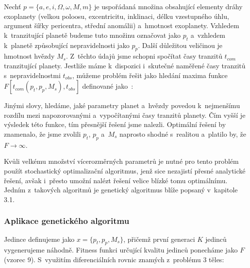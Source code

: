 \documentclass[a4paper,12pt]{article}
\begin{document}
{{{Nechť $p = \{a, e, i, \Omega, \omega, M, m\}$ je uspořádaná množina obsahující elementy dráhy exoplanety (velkou poloosu, excentricitu, inklinaci, délku vzestupného úhlu, argument šířky pericentra, střední anomálii) a~hmotnost exoplanety. Vzhledem k~tranzitující planetě budeme tuto množinu označovat jako $p_t$ a~vzhledem k~planetě způsobující nepravidelnosti jako $p_p$. Další důležitou veličinou je hmotnost hvězdy $M_s$. Z~těchto údajů jsme schopni spočítat časy tranzitů $t_{com}$ tranzitující planety. Jestliže máme k~dispozici i~skutečné naměřené časy tranzitů s~nepravidelnostmi $t_{obs}$, můžeme problém řešit jako hledání maxima funkce $F[t_{com}(p_t, p_p, M_s), t_{obs}]$ definované jako~\cite{ttv}:


Jinými slovy, hledáme, jaké parametry planet a~hvězdy povedou k~nejmenšímu rozdílu mezi napozorovanými a~vypočítanými časy tranzitů planety. Čím vyšší je výsledek této funkce, tím přesnější řešení jsme nalezli. Optimální řešení by znamenalo, že jsme zvolili $p_t$, $p_p$ a~$M_s$ naprosto shodné s~realitou a~platilo by, že $F\to\infty$.

Kvůli velkému množství vícerozměrných parametrů je nutné pro tento problém použít stochastický optimalizační algoritmus, jenž sice nezajistí přesné analytické řešení, avšak i~přesto umožní nalézt řešení velice blízké tomu optimálnímu. Jedním z~takových algoritmů je genetický algoritmus blíže popsaný v~kapitole 3.1.~\cite{ttv}

\subsubsection{Aplikace genetického algoritmu}

Jedince definujeme jako $x = \{p_t, p_p, M_s\}$, přičemž první generaci $K$ jedinců vygenerujeme náhodně. Fitness funkci určující kvalitu jedinců ponecháme jako $F$ (vzorec 9). S~využitím diferenciálních rovnic znamých z~problému 3 těles:


}}}
\end{document}
